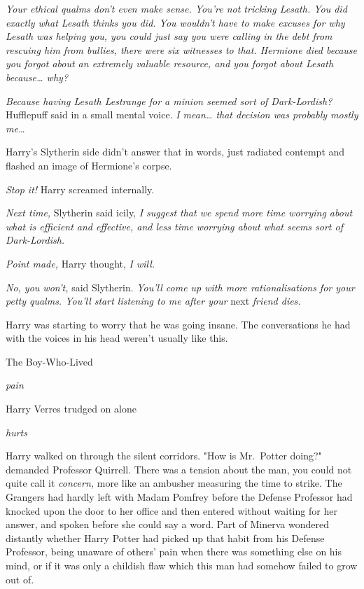 \emph{Your ethical qualms don't even make sense. You're not tricking Lesath. 
You did exactly what Lesath thinks you did. You wouldn't have to make excuses 
for why Lesath was helping you, you could just say you were calling in the debt 
from rescuing him from bullies, there were six witnesses to that. Hermione died 
because you forgot about an extremely valuable resource, and you forgot about 
Lesath because{\ldots} why?}

\emph{Because having Lesath Lestrange for a minion seemed sort of 
Dark-Lordish?} Hufflepuff said in a small mental voice. \emph{I mean{\ldots} 
that decision was probably mostly me{\ldots}}

Harry's Slytherin side didn't answer that in words, just radiated contempt and 
flashed an image of Hermione's corpse.

\emph{Stop it!} Harry screamed internally.

\emph{Next time,} Slytherin said icily, \emph{I suggest that we spend more time 
worrying about what is efficient and effective, and less time worrying about 
what seems sort of Dark-Lordish.}

\emph{Point made,} Harry thought, \emph{I will.}

\emph{No, you won't,} said Slytherin. \emph{You'll come up with more 
rationalisations for your petty qualms. You'll start listening to me after 
your} next \emph{friend dies.}

Harry was starting to worry that he was going insane. The conversations he had 
with the voices in his head weren't usually like this.

The Boy-Who-Lived

\emph{pain}

Harry Verres trudged on alone

\emph{hurts}

Harry walked on through the silent corridors.
\sbreak
"How is Mr.~Potter doing?" demanded Professor Quirrell. There was a tension 
about the man, you could not quite call it \emph{concern,} more like an 
ambusher measuring the time to strike. The Grangers had hardly left with Madam 
Pomfrey before the Defense Professor had knocked upon the door to her office 
and then entered without waiting for her answer, and spoken before she could 
say a word. Part of Minerva wondered distantly whether Harry Potter had picked 
up that habit from his Defense Professor, being unaware of others' pain when 
there was something else on his mind, or if it was only a childish flaw which 
this man had somehow failed to grow out of.

